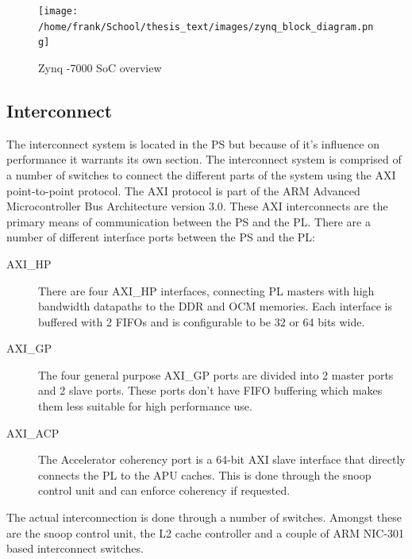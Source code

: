 \begin{figure}[H]
\centering
\texttt{[image: /home/frank/School/thesis\_text/images/zynq\_block\_diagram.png]}
\caption{Zynq -7000 SoC overview \cite{anon._zynq-7000_2013}}
\label{img:zynq_overview}
\end{figure}

	\subsection{Interconnect}
	The interconnect system is located in the PS but because of it's influence on performance it warrants its own section. The interconnect system is comprised of a number of switches to connect the different parts of the system using the AXI point-to-point protocol. The AXI protocol is part of the ARM Advanced Microcontroller Bus Architecture version 3.0. These AXI interconnects are the primary means of communication between the PS and the PL. There are a number of different interface ports between the PS and the PL:

		\begin{description}
			\item[AXI\_HP] There are four AXI\_HP interfaces, connecting PL masters with high bandwidth datapaths to the DDR and OCM memories. Each interface is buffered with 2 FIFOs and is configurable to be 32 or 64 bits wide.
			\item[AXI\_GP] The four general purpose AXI\_GP ports are divided into 2 master ports and 2 slave ports. These ports don't have FIFO buffering which makes them less suitable for high performance use. 
			\item[AXI\_ACP] The Accelerator coherency port is a 64-bit AXI slave interface that directly connects the PL to the APU caches. This is done through the snoop control unit and can enforce coherency if requested. 
		\end{description}

	The actual interconnection is done through a number of switches. Amongst these are the snoop control unit, the L2 cache controller and a couple of ARM NIC-301 based interconnect switches.

